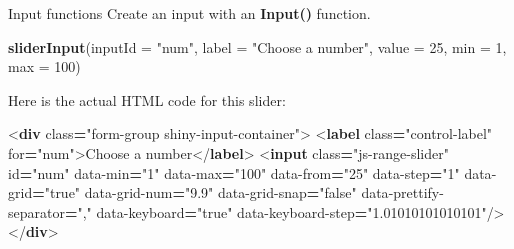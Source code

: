 \documentclass[
  ignorenonframetext,
]{beamer}
\newenvironment{Shaded}{\begin{snugshade}}{\end{snugshade}}
\newcommand{\AttributeTok}[1]{\textcolor[rgb]{0.13,0.29,0.53}{#1}}
\newcommand{\DataTypeTok}[1]{\textcolor[rgb]{0.13,0.29,0.53}{#1}}
\newcommand{\DecValTok}[1]{\textcolor[rgb]{0.00,0.00,0.81}{#1}}
\newcommand{\FunctionTok}[1]{\textcolor[rgb]{0.13,0.29,0.53}{\textbf{#1}}}
\newcommand{\KeywordTok}[1]{\textcolor[rgb]{0.13,0.29,0.53}{\textbf{#1}}}
\newcommand{\NormalTok}[1]{#1}
\newcommand{\OperatorTok}[1]{\textcolor[rgb]{0.81,0.36,0.00}{\textbf{#1}}}
\newcommand{\OtherTok}[1]{\textcolor[rgb]{0.56,0.35,0.01}{#1}}
\newcommand{\StringTok}[1]{\textcolor[rgb]{0.31,0.60,0.02}{#1}}
\begin{document}
\begin{frame}[fragile]{Input functions}
\label{input-functions}
Create an input with an \textbf{Input()} function.

\begin{Shaded}
\begin{Highlighting}[]
\FunctionTok{sliderInput}\NormalTok{(}\AttributeTok{inputId =} \StringTok{"num"}\NormalTok{, }
            \AttributeTok{label =} \StringTok{"Choose a number"}\NormalTok{, }
            \AttributeTok{value =} \DecValTok{25}\NormalTok{, }\AttributeTok{min =} \DecValTok{1}\NormalTok{, }\AttributeTok{max =} \DecValTok{100}\NormalTok{)}
\end{Highlighting}
\end{Shaded}

Here is the actual HTML code for this slider: \footnotesize

\begin{Shaded}
\begin{Highlighting}[]
\DataTypeTok{\textless{}}\KeywordTok{div}\OtherTok{ class}\OperatorTok{=}\StringTok{"form{-}group shiny{-}input{-}container"}\DataTypeTok{\textgreater{}}
  \DataTypeTok{\textless{}}\KeywordTok{label}\OtherTok{ class}\OperatorTok{=}\StringTok{"control{-}label"}\OtherTok{ for}\OperatorTok{=}\StringTok{"num"}\DataTypeTok{\textgreater{}}\NormalTok{Choose a number}\DataTypeTok{\textless{}/}\KeywordTok{label}\DataTypeTok{\textgreater{}}
  \DataTypeTok{\textless{}}\KeywordTok{input}\OtherTok{ class}\OperatorTok{=}\StringTok{"js{-}range{-}slider"}\OtherTok{ id}\OperatorTok{=}\StringTok{"num"}\OtherTok{ data{-}min}\OperatorTok{=}\StringTok{"1"}\OtherTok{ data{-}max}\OperatorTok{=}\StringTok{"100"}
\OtherTok{  data{-}from}\OperatorTok{=}\StringTok{"25"}\OtherTok{ data{-}step}\OperatorTok{=}\StringTok{"1"}\OtherTok{ data{-}grid}\OperatorTok{=}\StringTok{"true"}\OtherTok{ data{-}grid{-}num}\OperatorTok{=}\StringTok{"9.9"}
\OtherTok{  data{-}grid{-}snap}\OperatorTok{=}\StringTok{"false"}\OtherTok{ data{-}prettify{-}separator}\OperatorTok{=}\StringTok{","}\OtherTok{ data{-}keyboard}\OperatorTok{=}\StringTok{"true"}
\OtherTok{  data{-}keyboard{-}step}\OperatorTok{=}\StringTok{"1.01010101010101"}\DataTypeTok{/\textgreater{}}
\DataTypeTok{\textless{}/}\KeywordTok{div}\DataTypeTok{\textgreater{}}
\end{Highlighting}
\end{Shaded}
\end{frame}
\end{document}
